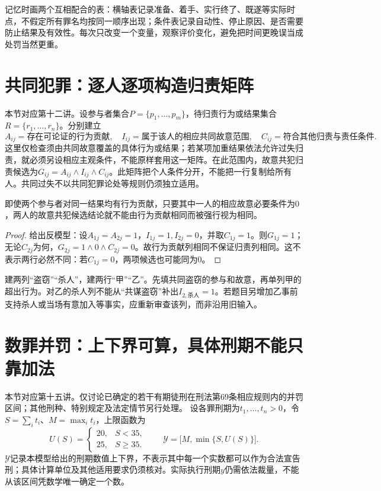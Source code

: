 记忆时画两个互相配合的表：横轴表记录准备、着手、实行终了、既遂等实际时点，不假定所有罪名均按同一顺序出现；条件表记录自动性、停止原因、是否需要防止结果及有效性。每次只改变一个变量，观察评价变化，避免把时间更晚误当成处罚当然更重。

\section{共同犯罪：逐人逐项构造归责矩阵}
本节对应第十二讲。设参与者集合$P=\{p_1,\ldots,p_m\}$，待归责行为或结果集合$R=\{r_1,\ldots,r_n\}$。分别建立
\[
 A_{ij}=\text{存在可论证的行为贡献},\quad
 I_{ij}=\text{属于该人的相应共同故意范围},\quad
 C_{ij}=\text{符合其他归责与责任条件}.
\]
这里仅检查须由共同故意覆盖的具体行为或结果；若某项加重结果依法允许过失归责，就必须另设相应主观条件，不能原样套用这一矩阵。在此范围内，故意共犯归责候选为$G_{ij}=A_{ij}\wedge I_{ij}\wedge C_{ij}$。此矩阵把个人条件分开，不能把一行复制给所有人。共同过失不以共同犯罪论处等规则仍须独立适用。

\begin{modelprop}
即使两个参与者对同一结果均有行为贡献，只要其中一人的相应故意必要条件为$0$，两人的故意共犯候选结论就不能由行为贡献相同而被强行视为相同。
\end{modelprop}
\begin{proof}
给出反模型：设$A_{1j}=A_{2j}=1$，$I_{1j}=1,I_{2j}=0$，并取$C_{1j}=1$。则$G_{1j}=1$；无论$C_{2j}$为何，$G_{2j}=1\wedge0\wedge C_{2j}=0$。故行为贡献列相同不保证归责列相同。这不表示两行必然不同：若$C_{1j}=0$，两项候选也可能同为$0$。
\end{proof}

建两列“盗窃”“杀人”，建两行“甲”“乙”。先填共同盗窃的参与和故意，再单列甲的超出行为。对乙的杀人列不能从“共谋盗窃”补出$I_{2,\text{杀人}}=1$。若题目另增加乙事前支持杀人或当场有意加入等事实，应重新审查该列，而非沿用旧输入。


\section{数罪并罚：上下界可算，具体刑期不能只靠加法}
本节对应第十五讲。仅讨论已确定的若干有期徒刑在刑法第69条相应规则内的并罚区间；其他刑种、特别规定及法定情节另行处理。
设各罪刑期为$t_1,\ldots,t_n>0$，令$S=\sum_i t_i$、$M=\max_i t_i$，上限函数为
\[
 U(S)=\begin{cases}20,&S<35,\\25,&S\ge35.\end{cases}
 \qquad
 \mathcal Y=\bigl[M,\min\{S,U(S)\}\bigr].
\]
$\mathcal Y$记录本模型给出的刑期数值上下界，不表示其中每一个实数都可以作为合法宣告刑；具体计算单位及其他适用要求仍须核对。实际执行刑期$y$仍需依法裁量，不能从该区间凭数学唯一确定一个数。

